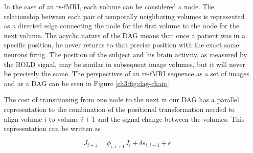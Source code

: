 In the case of an rs-fMRI, each volume can be considered a node. The relationship between each pair of temporally neighboring volumes is represented as a directed edge connecting the node for the first volume to the node for the next volume. The acyclic nature of the DAG means that once a patient was in a specific position, he never returns to that precise position with the exact same neurons firing. The position of the subject and his brain activity, as measured by the BOLD signal, may be similar in subsequent image volumes, but it will never be precisely the same. The perspectives of an rs-fMRI sequence as a set of images and as a DAG can be seen in Figure \ref{ch3:fig:dag-chain}.

The cost of transitioning from one node to the next in our DAG has a parallel representation to the combination of the positional transformation needed to align volume $i$ to volume $i+1$ and the signal change between the volumes. This representation can be written as 

\begin{equation}
J_{i+1} = \phi_{i,i+1} J_i + \delta s_{i,i+1} + \epsilon
\end{equation}


